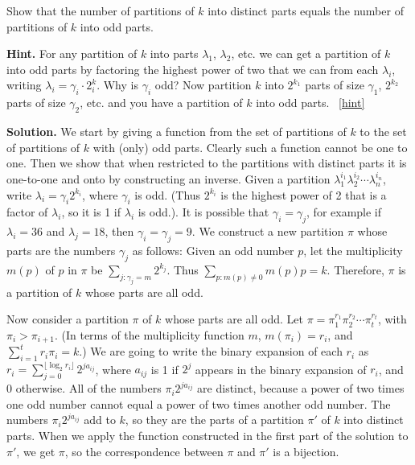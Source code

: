\documentclass{book}
\begin{document}
\setcounter{project}{314}
\addtocounter{project}{-1}
\begin{activity}[]\label{activity-307}
\hypertarget{p-1579}{}%
Show that the number of partitions of \(k\) into distinct parts equals the number of partitions of \(k\) into odd parts.%
\par\smallskip%
\noindent\textbf{Hint.}\hypertarget{hint-202}{}\quad%
\hypertarget{p-1580}{}%
For any partition of \(k\) into parts \(\lambda_1\), \(\lambda_2\), etc. we can get a partition of \(k\) into odd parts by factoring the highest power of two that we can from each \(\lambda_i\), writing \(\lambda_i = \gamma_i\cdot 2^k_i\).  Why is \(\gamma_i\) odd? Now partition \(k\) into \(2^{k_1}\) parts of size \(\gamma_1\), \(2^{k_2}\) parts of size \(\gamma_2\), etc. and you have a partition of \(k\) into odd parts.%
~\hfill{\tiny\hyperlink{a-314}{[hint]}\hypertarget{q-314}{}}\par\smallskip%
\noindent\textbf{Solution.}\hypertarget{solution-217}{}\quad%
\hypertarget{p-1581}{}%
We start by giving a function from the set of partitions of \(k\) to the set of partitions of \(k\) with (only) odd parts. Clearly such a function cannot be one to one. Then we show that when restricted to the partitions with distinct parts it is one-to-one and onto by constructing an inverse. Given a partition \(\lambda_1^{i_1}\lambda_2^{i_2}\cdots\lambda_n^{i_n}\), write \(\lambda_i=\gamma_i2^{k_i}\), where \(\gamma_i\) is odd. (Thus \(2^{k_i}\) is the highest power of 2 that is a factor of \(\lambda_i\), so it is 1 if \(\lambda_i\) is odd.). It is possible that \(\gamma_i=\gamma_j\), for example if \(\lambda_i=36\) and \(\lambda_j=18\), then \(\gamma_i=\gamma_j=9\). We construct a new partition \(\pi\) whose parts are the numbers \(\gamma_j\) as follows: Given an odd number \(p\), let the multiplicity \(m(p)\) of \(p\) in \(\pi\) be \(\sum_{j: \gamma_j=m} 2^{k_j}\). Thus \(\sum_{p: m(p)\not=0}m(p)p = k\). Therefore, \(\pi\) is a partition of \(k\) whose parts are all odd.%
\par
\hypertarget{p-1582}{}%
Now consider a partition \(\pi\) of \(k\) whose parts are all odd. Let \(\pi=\pi_1^{r_1}\pi_2^{r_2}\cdots \pi_t^{r_t}\), with \(\pi_i>\pi_{i+1}\). (In terms of the multiplicity function \(m\), \(m(\pi_i) =r_i\), and \(\sum_{i=1}^t r_i\pi_i = k\).) We are going to write the binary expansion of each \(r_i\) as \(r_i = \sum_{j= 0}^{\lfloor \log_2 r_i\rfloor} 2^{ja_{ij}}\), where \(a_{ij}\) is 1 if \(2^j\) appears in the binary expansion of \(r_i\), and 0 otherwise. All of the numbers \(\pi_i2^{ja_{ij}}\) are distinct, because a power of two times one odd number cannot equal a power of two times another odd number. The numbers \(\pi_i2^{ja_{ij}}\) add to \(k\), so they are the parts of a partition \(\pi'\) of \(k\) into distinct parts. When we apply the function constructed in the first part of the solution to \(\pi'\), we get \(\pi\), so the correspondence between \(\pi\) and \(\pi'\) is a bijection.%
\end{activity}
\end{document}
